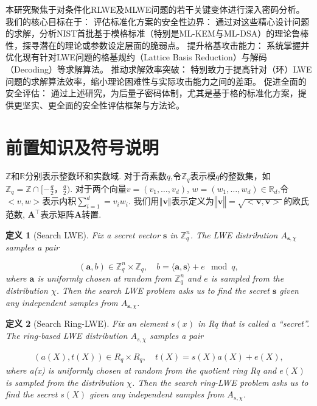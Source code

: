 \documentclass[12pt,a4paper]{article}
\newtheorem{definition}{定义} %
\numberwithin{equation}{section}
\begin{document}
本研究聚焦于对条件化RLWE及MLWE问题的若干关键变体进行深入密码分析。 我们的核心目标在于：
评估标准化方案的安全性边界： 通过对这些精心设计问题的求解，分析NIST首批基于模格标准（特别是ML-KEM与ML-DSA）的理论鲁棒性，探寻潜在的理论或参数设定层面的脆弱点。
提升格基攻击能力： 系统掌握并优化现有针对LWE问题的格基规约（Lattice Basis Reduction）与解码（Decoding）等求解算法。
推动求解效率突破： 特别致力于提高针对（环）LWE问题的求解算法效率，缩小理论困难性与实际攻击能力之间的差距。
促进全面的安全评估： 通过上述研究，为后量子密码体制，尤其是基于格的标准化方案，提供更坚实、更全面的安全性评估框架与方法论。






\section{前置知识及符号说明}
$\mathbb{Z}$和$\mathbb{R}$分别表示整数环和实数域.
对于奇素数$q$,令$\mathbb{Z}_q$表示模$q$的整数集，如$\mathbb{Z}_q = \mathbb{Z}\cap[-\frac{q}{2}，\frac{q}{2})$.
对于两个向量$v =(v_1 , \ldots , v_d)$, $w = ( w_1 , \ldots , w_d) \in \mathbb{R}_d$,令$<v,w>$表示内积$ \sum_{i=1}^{d}= v_iw_i$.
我们用$‖\mathbf{v}‖$表示定义为$‖\mathbf{v}‖=\sqrt{<\mathbf{v},\mathbf{v}>}$的欧氏范数, $\mathbf{A}^\top$表示矩阵$\mathbf{A}$转置.

\begin{definition}[Search LWE]
Fix a secret vector $\mathbf{s}$ in $\mathbb{Z}_q^n$.  
The LWE distribution $A_{\mathbf{s},\chi}$ samples a pair  

\[
(\mathbf{a}, b) \in \mathbb{Z}_q^n \times \mathbb{Z}_q, \quad b = \langle \mathbf{a}, \mathbf{s} \rangle + e \mod q,
\]  
where $\mathbf{a}$ is uniformly chosen at random from $\mathbb{Z}_q^n$ and $e$ is sampled from the distribution $\chi$. Then the search LWE problem asks us to find the secret $\mathbf{s}$ given any independent samples from $A_{\mathbf{s},\chi}$.  
\end{definition}

\begin{definition}[Search Ring-LWE]
Fix an element $s(x)$ in Rq that is called a “secret”. 
The ring-based LWE distribution $A_{s,\chi}$ samples a pair

\begin{align*}
    (a(X), t(X)) \in R_q \times R_q, \quad t(X) = s(X)a(X) + e(X),
\end{align*}
where a(x) is uniformly chosen at random from the quotient ring Rq and $e(X)$ is sampled from the distribution $\chi$. Then the search ring-LWE problem asks us to find the secret $s(X)$ given any independent samples from $A_{s,\chi}$.
\end{definition}
\end{document}
